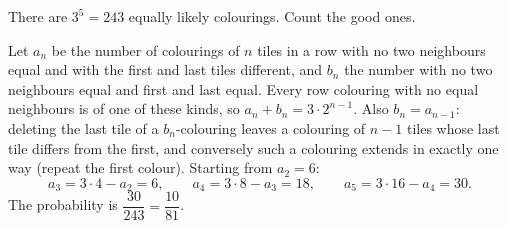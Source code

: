 There are $3^5=243$ equally likely colourings. Count the good ones.

Let $a_n$ be the number of colourings of $n$ tiles in a row with no two neighbours equal and with the first and last tiles different, and $b_n$ the number with no two neighbours equal and first and last equal. Every row colouring with no equal neighbours is of one of these kinds, so $a_n+b_n=3\cdot2^{n-1}$. Also $b_n=a_{n-1}$: deleting the last tile of a $b_n$-colouring leaves a colouring of $n-1$ tiles whose last tile differs from the first, and conversely such a colouring extends in exactly one way (repeat the first colour). Starting from $a_2=6$:
\[
a_3=3\cdot4-a_2=6,\qquad a_4=3\cdot8-a_3=18,\qquad a_5=3\cdot16-a_4=30 .
\]
The probability is $\dfrac{30}{243}=\boxed{\dfrac{10}{81}}$.
